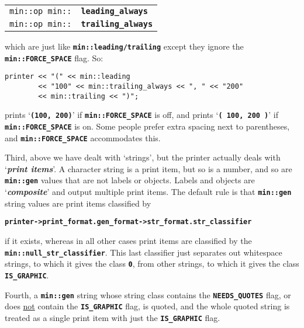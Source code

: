 \documentclass[12pt]{article}
\makeatletter
\newcommand{\TT}[1]{{\tt \bfseries #1}}
\newcommand{\key}[1]{{\bf \em #1}\index{#1}}
\newcommand{\ikey}[2]{{\bf \em #1}\index{#2}}
\newcommand{\ttindex}[1]{\index{#1@{\tt #1}}}
\newcommand{\EOL}{\penalty \exhyphenpenalty}
\newenvironment{indpar}[1][0.3in]%
	{\begin{list}{}%
		     {\setlength{\itemsep}{0in}%
		      \setlength{\topsep}{0in}%
		      \setlength{\parsep}{1ex}%
		      \setlength{\labelwidth}{#1}%
		      \setlength{\leftmargin}{#1}%
		      \addtolength{\leftmargin}{\labelsep}}%
	 \item}%
	{\end{list}}
\newcommand{\LABEL}[1]{\label{#1}}
\newcommand{\MINKEY}[1]%
	   {\TT{#1}\ttindex{min::#1}\ttindex{#1}}
\makeatother
\begin{document}
\begin{indpar}[1em]\begin{tabular}{r@{}l}
\verb|min::op min::| & \MINKEY{leading\_always}
\LABEL{MIN::LEADING_ALWAYS} \\
\verb|min::op min::| & \MINKEY{trailing\_always}
\LABEL{MIN::TRAILING_ALWAYS} \\
\end{tabular}\end{indpar}

which are just like \TT{min::leading/trailing} except they
ignore the \TT{min::\EOL FORCE\_\EOL SPACE} flag.  So:

\begin{indpar}\begin{verbatim}
printer << "(" << min::leading
        << "100" << min::trailing_always << ", " << "200"
        << min::trailing << ")";
\end{verbatim}\end{indpar}
prints `\TT{(100, 200)}' if \TT{min::\EOL FORCE\_\EOL SPACE} is off, and
prints `\TT{( 100, 200 )}' if \TT{min::\EOL FORCE\_\EOL SPACE} is on.
Some people prefer extra spacing next to parentheses, and
\TT{min::\EOL FORCE\_\EOL SPACE} accommodates this.

Third, above we have dealt with `strings', but the printer actually
deals with
`\ikey{print items}{print item}'\label{PRINT-ITEM}.
A character string is a print item, but so is a number, and so are
\TT{min::gen} values that are not labels or objects.  Labels and
objects are `\key{composite}' and output multiple print items.
The default rule is that \TT{min::gen} string values are print
items classified by

\begin{center}
\TT{printer->print\_format.gen\_format->str\_format.str\_classifier}
\end{center}

if it exists, whereas in all other cases print items are classified by
the \TT{min::\EOL null\_\EOL str\_\EOL classifier}.
This last classifier just separates out whitespace strings, to which
it gives the class \TT{0}, from other strings, to which it gives
the class \TT{IS\_\EOL GRAPHIC}.

Fourth, a \TT{min::gen} string whose string class contains the
\TT{NEEDS\_\EOL QUOTES} flag, or does \underline{not}
contain the \TT{IS\_\EOL GRAPHIC} flag, is quoted,
and the whole quoted string is treated as a single print item with just the
\TT{IS\_\EOL GRAPHIC} flag.
\end{document}

